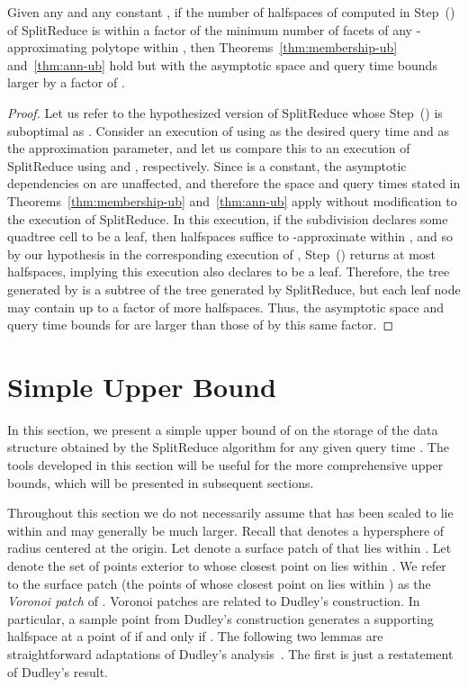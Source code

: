\documentclass[11pt]{article}   \usepackage[letterpaper,hmargin=2.1cm,vmargin=3cm]{geometry}
\newcommand{\alg}{\textrm{SplitReduce}}
\begin{document}
\begin{lemma} \label{lem:weak-membership}
Given any  and any constant , if the number of halfspaces of  computed in Step~(\stepapx) of {\alg} is within a factor  of the minimum number of facets of any -approximating polytope within , then Theorems~\ref{thm:membership-ub} and~\ref{thm:ann-ub} hold but with the asymptotic space and query time bounds larger by a factor of .
\end{lemma}


\begin{proof}
Let us refer to the hypothesized version of {\alg} whose Step~(\stepapx) is suboptimal as . Consider an execution of  using  as the desired query time and  as the approximation parameter, and let us compare this to an execution of {\alg} using  and , respectively. Since  is a constant, the asymptotic dependencies on  are unaffected, and therefore the space and query times stated in Theorems~\ref{thm:membership-ub} and~\ref{thm:ann-ub} apply without modification to the execution of {\alg}. In this execution, if the subdivision declares some quadtree cell  to be a leaf, then  halfspaces suffice to -approximate  within , and so by our hypothesis in the corresponding execution of , Step~(\stepapx) returns at most  halfspaces, implying this execution also declares  to be a leaf. Therefore, the tree generated by  is a subtree of the tree generated by {\alg}, but each leaf node may contain up to a factor of  more halfspaces. Thus, the asymptotic space and query time bounds for  are larger than those of  by this same factor.
\end{proof}


\section{Simple Upper Bound} \label{sec:firstbound}


In this section, we present a simple upper bound of  on the storage of the data structure obtained by the {\alg} algorithm for any given query time . The tools developed in this section will be useful for the more comprehensive upper bounds, which will be presented in subsequent sections.

Throughout this section we do not necessarily assume that  has been scaled to lie within  and may generally be much larger. Recall that  denotes a hypersphere of radius  centered at the origin. Let  denote a surface patch of  that lies within . Let  denote the set of points exterior to  whose closest point on  lies within . We refer to the surface patch  (the points of  whose closest point on  lies within ) as the \emph{Voronoi patch} of . Voronoi patches are related to Dudley's construction. In particular, a sample point  from Dudley's construction generates a supporting halfspace at a point of  if and only if . The following two lemmas are straightforward adaptations of Dudley's analysis~\cite{Dudley}. The first is just a restatement of Dudley's result.
\end{document}
